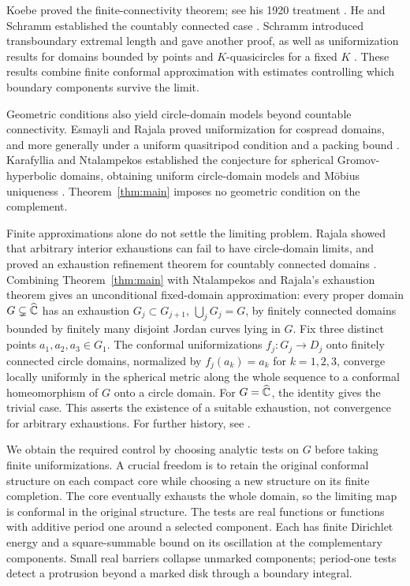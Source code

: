 Koebe proved the finite-connectivity theorem; see his 1920 treatment
\cite{Koebe1920}. He and Schramm established the countably connected
case \cite[Theorem~0.1]{HeSchramm1993}. Schramm introduced transboundary
extremal length and gave another proof, as well as uniformization results
for domains bounded by points and $K$-quasicircles for a fixed $K$
\cite{Schramm1995}.  These results combine
finite conformal approximation with estimates controlling which
boundary components survive the limit.

Geometric conditions also yield circle-domain models beyond countable
connectivity.  Esmayli and Rajala proved uniformization for cospread
domains, and more generally under a uniform quasitripod condition and
a packing bound \cite[Theorem~1.3 and Corollary~1.6]{EsmayliRajala2026}.
Karafyllia and Ntalampekos established the conjecture for spherical
Gromov-hyperbolic domains, obtaining uniform circle-domain models and
M\"obius uniqueness \cite[Theorem~1.2]{KarafylliaNtalampekos2024}.
Theorem~\ref{thm:main} imposes no geometric condition on the complement.

Finite approximations alone do not settle the limiting problem.
Rajala showed that arbitrary interior exhaustions can fail to have
circle-domain limits, and proved an exhaustion refinement theorem for
countably connected domains \cite[Theorems~1.1--1.3]{Rajala2025}.
Combining Theorem~\ref{thm:main} with Ntalampekos and Rajala's
exhaustion theorem \cite[Theorem~1.1]{NtalampekosRajala2025} gives an
unconditional fixed-domain approximation: every proper domain
$G\subsetneq\widehat{\mathbb C}$ has an exhaustion $G_j\subset G_{j+1}$,
$\bigcup_jG_j=G$, by finitely connected domains bounded by finitely many
disjoint Jordan curves lying in $G$. Fix three distinct points
$a_1,a_2,a_3\in G_1$. The conformal uniformizations
$f_j:G_j\to D_j$ onto finitely connected circle domains, normalized by
$f_j(a_k)=a_k$ for $k=1,2,3$, converge locally uniformly in the spherical
metric along the whole sequence to a conformal homeomorphism of $G$
onto a circle domain. For $G=\widehat{\mathbb C}$, the identity gives the trivial case.
This asserts the existence of a suitable exhaustion, not convergence
for arbitrary exhaustions. For further history, see \cite{Ntalampekos2026}.

We obtain the required control by choosing analytic tests on $G$ before
taking finite uniformizations.  A crucial freedom is to retain the
original conformal structure on each compact core while choosing a new
structure on its finite completion.  The core eventually exhausts the
whole domain, so the limiting map is conformal in the original
structure.  The tests are real functions or functions
with additive period one around a selected component. Each has finite
Dirichlet energy and a square-summable bound on its oscillation at the
complementary components. Small real barriers collapse unmarked
components; period-one tests detect a protrusion beyond a marked disk
through a boundary integral.

